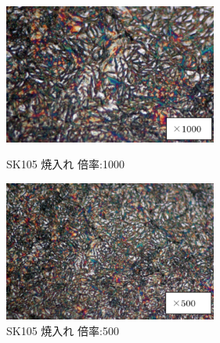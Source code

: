 \documentclass[10pt,a4j]{jsarticle}
\begin{document}
  \begin{figure}[htbp]
    \begin{minipage}{0.5\hsize}
      \begin{center}
        \includegraphics[width=7cm]{../img/SK105_yakiire_1000.png}
        \caption{SK105 焼入れ 倍率:1000}
      \end{center}
    \end{minipage}
    \begin{minipage}{0.5\hsize}
      \begin{center}
        \includegraphics[width=7cm]{../img/SK105_yakiire_500.png}
        \caption{SK105 焼入れ 倍率:500}
      \end{center}
    \end{minipage}
  \end{figure}
\end{document}
